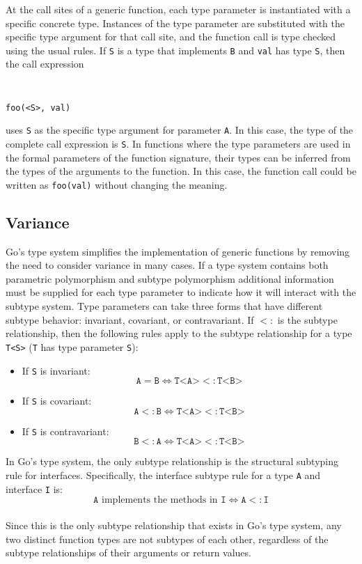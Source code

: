 \documentclass[letterpaper,twocolumn,11pt]{article}
\begin{document}
At the call sites of a generic function, each type parameter is instantiated with a specific concrete type. Instances of the type parameter are substituted with the specific type argument for that call site, and the function call is type checked using the usual rules. If \texttt{S} is a type that implements \texttt{B} and \texttt{val} has type \texttt{S}, then the call expression
{ \tt \small
\begin{verbatim}
foo(<S>, val)
\end{verbatim}
}
uses \texttt{S} as the specific type argument for parameter \texttt{A}. In this case, the type of the complete call expression is \texttt{S}. In functions where the type parameters are used in the formal parameters of the function signature, their types can be inferred from the types of the arguments to the function. In this case, the function call could be written as \texttt{foo(val)} without changing the meaning.

\subsection{Variance} \label{variance}

Go's type system simplifies the implementation of generic functions by removing the need to consider variance in many cases. If a type system contains both parametric polymorphism and subtype polymorphism additional information must be supplied for each type parameter to indicate how it will interact with the subtype system. Type parameters can take three forms that have different subtype behavior: invariant, covariant, or contravariant. If $<:$ is the subtype relationship, then the following rules apply to the subtype relationship for a type \texttt{T<S>} (\texttt{T} has type parameter \texttt{S}):

\begin{itemize}
\item If \texttt{S} is invariant: \\
\[\texttt{A} = \texttt{B} \iff \texttt{T<A>} <: \texttt{T<B>}\]
\item If \texttt{S} is covariant:\\
\[\texttt{A} <: \texttt{B} \iff \texttt{T<A>} <: \texttt{T<B>}\]
\item If \texttt{S} is contravariant:\\
\[\texttt{B} <: \texttt{A} \iff \texttt{T<A>} <: \texttt{T<B>}\]
\end{itemize}

In Go's type system, the only subtype relationship is the structural subtyping rule for interfaces. Specifically, the interface subtype rule for a type \texttt{A} and interface \texttt{I} is:\\
\[\texttt{A}\textrm{ implements the methods in }\texttt{I} \iff \texttt{A} <: \texttt{I}\]\\
Since this is the only subtype relationship that exists in Go's type system, any two distinct function types are not subtypes of each other, regardless of the subtype relationships of their arguments or return values. 
\end{document}
